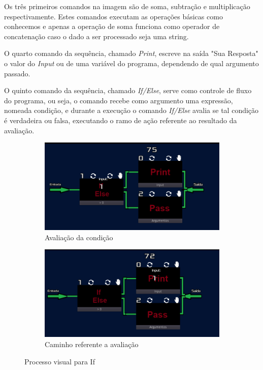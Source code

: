Os três primeiros comandos na imagem são de soma, subtração e multiplicação
respectivamente. Estes comandos executam as operações básicas como conhecemos e
apenas a operação de soma funciona como operador de concatenação caso o dado a
ser processado seja uma string.

O quarto comando da sequência, chamado \textit{Print}, escreve na saída 
"Sua Resposta" o valor do \textit{Input} ou de uma variável do programa,
dependendo de qual argumento passado.

O quinto comando da sequência, chamado \textit{If/Else}, serve como controle de 
fluxo do programa, ou seja, o comando recebe como argumento uma expressão, 
nomeada condição, e durante a execução o comando \textit{If/Else} avalia se 
tal condição é verdadeira ou falsa, executando o ramo de ação referente ao 
resultado da avaliação.

\begin{figure}[H]
    \centering
    \begin{subfigure}{0.48\textwidth}
        \centering
        \includegraphics[width=1\textwidth]{../figuras/avaliacao_if.png}
        \caption{Avaliação da condição}
    \end{subfigure}
    \begin{subfigure}{0.48\textwidth}
        \centering
        \includegraphics[width=1\textwidth]{../figuras/caminho_if.png}
        \caption{Caminho referente a avaliação}
    \end{subfigure}  
    \caption{Processo visual para If}
\end{figure}

